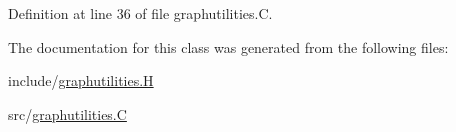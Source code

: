 Definition at line 36 of file graphutilities.\+C.



The documentation for this class was generated from the following files\+:\begin{DoxyCompactItemize}
\item 
include/\hyperlink{graphutilities_8_h}{graphutilities.\+H}\item 
src/\hyperlink{graphutilities_8_c}{graphutilities.\+C}\end{DoxyCompactItemize}
